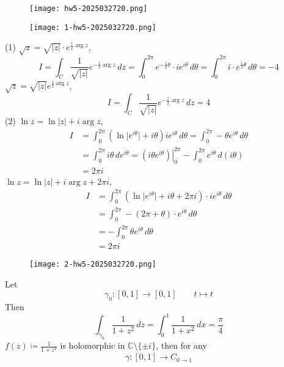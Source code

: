 \begin{exercise}
\begin{figure}[H]
\centering
\texttt{[image: hw5-2025032720.png]}
\label{}
\end{figure}
\begin{figure}[H]
\centering
\texttt{[image: 1-hw5-2025032720.png]}
\label{}
\end{figure}
\end{exercise}
(1)
$\sqrt{ z }=\sqrt{ \lvert z \rvert }\cdot e^{ \frac{i}{2}\arg z }$,
\[
I=\int_{C}^{} \frac{1}{\sqrt{ \lvert z \rvert  }} e^{ -\frac{i}{2}\arg z } \, dz=\int_{0}^{2\pi} e^{ -\frac{i}{2}\theta }\cdot ie^{ i\theta } \, d\theta=\int_{0}^{2\pi} i\cdot e^{ \frac{i}{2}\theta } \, d\theta =  -4
\]
$\sqrt{ z }=\sqrt{ \lvert z \rvert }e^{ \frac{i}{2}\arg z }$,
\[
I=\int_{C}^{} \frac{1}{\sqrt{ \lvert z \rvert  }} e^{ -\frac{i}{2}\arg z } \, dz=4
\]
(2)
$\ln z=\ln \lvert z \rvert+i\arg z$,
\[
\begin{aligned}
I & =\int_{0}^{2\pi} (\ln \lvert e^{ i\theta } \rvert+i\theta) ie^{ i\theta } \, d\theta=\int_{0}^{2\pi} -\theta e^{ i\theta } \, d\theta \\
 & =\int_{0}^{2\pi} i\theta \, de^{ i\theta }=\left.(i\theta e^{ i\theta })\right| ^{2\pi}_{0}-\int_{0}^{2\pi} e^{ i\theta  } \, d(i\theta) \\
 & =2\pi i
\end{aligned} 
\]
$\ln z=\ln \lvert z \rvert+i\arg z+2\pi i$,
\[
\begin{aligned}
I & =\int_{0}^{2\pi} (\ln \lvert e^{ i\theta } \rvert +i\theta+2\pi i)\cdot ie^{ i\theta } \, d\theta  \\
 & =\int_{0}^{2\pi} -(2\pi+\theta)\cdot e^{ i\theta } \, d\theta \\
  & =-\int_{0}^{2\pi} \theta e^{ i\theta } \, d\theta \\
  & =2\pi i
\end{aligned}
\]
\begin{exercise}
\begin{figure}[H]
\centering
\texttt{[image: 2-hw5-2025032720.png]}
\label{}
\end{figure}
\end{exercise}
Let
\[
\gamma_0:[0,1]\to[0,1]\qquad t\mapsto t
\]
Then
\[
\int_{\gamma_0}^{} \frac{1}{1+z^2}  \, dz=\int_{0}^{1} \frac{1}{1+x^2}  \, dx =\frac{\pi}{4}
\]
$f (z)\coloneqq \frac{1}{1+z^2}$ is holomorphic in $\mathbb{C}\setminus \{ \pm i \}$, then for any
\[
\gamma:[0,1]\to C_{0\to1}
\]
